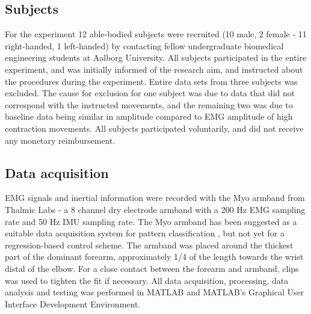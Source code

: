 \subsection{Subjects}
For the experiment 12 able-bodied subjects were recruited (10 male, 2 female - 11 right-handed, 1 left-handed) by contacting fellow undergraduate biomedical engineering students at Aalborg University. All subjects participated in the entire experiment, and was initially informed of the research aim, and instructed about the procedures during the experiment. Entire data sets from three subjects was excluded. The cause for exclusion for one subject was due to data that did not correspond with the instructed movements, and the remaining two was due to baseline data being similar in amplitude compared to EMG amplitude of high contraction movements. All subjects participated voluntarily, and did not receive any monetary reimbursement. 

\subsection{Data acquisition}
EMG signals and inertial information were recorded with the Myo armband from Thalmic Labs - a 8 channel dry electrode armband with a 200 Hz EMG sampling rate and 50 Hz IMU sampling rate. The Myo armband has been suggested as a suitable data acquisition system for pattern classification \cite{Mendez2017}, but not yet for a regression-based control scheme. 
The armband was placed around the thickest part of the dominant forearm, approximately 1/4 of the length towards the wrist distal of the elbow. For a close contact between the forearm and armband, clips was used to tighten the fit if necessary. All data acquisition, processing, data analysis and testing was performed in MATLAB and MATLAB's Graphical User Interface Development Environment.

